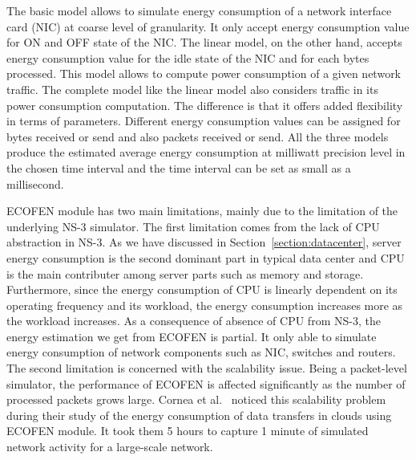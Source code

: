 The basic model allows to simulate energy consumption of a network interface card (NIC) at coarse level of granularity. It only accept energy consumption value for ON and OFF state of the NIC. The linear model, on the other hand, accepts energy consumption value for the idle state of the NIC and for each bytes processed. This model allows to compute power consumption of a given network traffic. The complete model like the linear model also considers traffic in its power consumption computation. The difference is that it offers added flexibility in terms of parameters. Different energy consumption values can be assigned for bytes received or send and also packets received or send. All the three models produce the estimated average energy consumption at milliwatt precision level in the chosen time interval and the time interval can be set as small as a millisecond. 

ECOFEN module has two main limitations, mainly due to the limitation of the underlying NS-3 simulator. The first limitation comes from the lack of CPU abstraction in NS-3. As we have discussed in Section~\ref{section:datacenter}, server energy consumption is the second dominant part in typical data center and CPU is the main contributer among server parts such as memory and storage. Furthermore, since the energy consumption of CPU is linearly dependent on its operating frequency and its workload, the energy consumption increases more as the workload increases. As a consequence of absence of CPU from NS-3, the energy estimation we get from ECOFEN is partial. It only able to simulate energy consumption of network components such as NIC, switches and routers. The second limitation is concerned with the scalability issue. Being a packet-level simulator, the performance of ECOFEN is affected significantly as the number of processed packets grows large. Cornea et al.{\ }\cite{DBLP:conf/cloudnet/CorneaOL14} noticed this scalability problem during their study of the energy consumption of data transfers in clouds using ECOFEN module. It took them 5 hours to capture 1 minute of simulated network activity for a large-scale network. 

